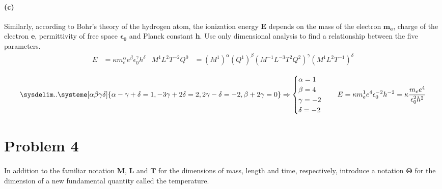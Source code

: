 \documentclass[]{article}
\begin{document}
{		\paragraph*{(c)} Similarly, according to Bohr's theory of the hydrogen atom, the ionization energy $\bm{E}$ depends on the mass of the electron $\bm{m_e}$, charge of the electron $\bm{e}$, permittivity of free space $\bm{\epsilon_0}$ and Planck constant $\bm{h}$. Use only dimensional analysis to find a relationship between the five parameters.
			\begin{equation*}
				\begin{aligned}
					E &= \kappa m_e^{\alpha} e^{\beta} \epsilon_0^{\gamma} h^{\delta} & M^1 L^2 T^{-2} Q^0 &= (M^1)^{\alpha} (Q^1)^{\beta} (M^{-1} L^{-3} T^2 Q^2)^{\gamma} (M^1 L^2 T^{-1})^{\delta}
					\\
				\end{aligned}
			\end{equation*}
			\begin{equation*}
				\sysdelim..\systeme[\alpha\beta\gamma\delta]{
					\alpha - \gamma + \delta= 1, 
					-3\gamma + 2\delta = 2,
					2\gamma - \delta = -2,
					\beta + 2\gamma = 0
				} \Rightarrow
				\begin{cases}
					\alpha = 1 \\
					\beta = 4 \\
					\gamma = -2 \\
					\delta = -2
				\end{cases}
				\quad
				E = \kappa m_e^{1} e^{4} \epsilon_0^{-2} h^{-2} = \kappa \frac{m_e e^4}{\epsilon_0^2 h^2}
			\end{equation*}
			
				
	\section*{Problem 4}

		\paragraph{} In addition to the familiar notation $\bm{M}$, $\bm{L}$ and $\bm{T}$ for the dimensions of mass, length and time, respectively, introduce a notation $\bm{\Theta}$ for the dimension of a new fundamental quantity called the temperature.
		
}
\end{document}
